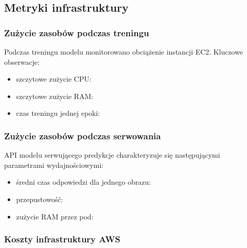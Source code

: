 
\subsection{Metryki infrastruktury}

\subsubsection{Zużycie zasobów podczas treningu}


Podczas treningu modelu monitorowano obciążenie instancji EC2. Kluczowe obserwacje:
\begin{itemize}
  \item szczytowe zużycie CPU: %
  \item szczytowe zużycie RAM: %
  \item czas treningu jednej epoki: %
\end{itemize}

\subsubsection{Zużycie zasobów podczas serwowania}


API modelu serwującego predykcje charakteryzuje się następującymi parametrami wydajnościowymi:
\begin{itemize}
  \item średni czas odpowiedzi dla jednego obrazu: %
  \item przepustowość: %
  \item zużycie RAM przez pod: %
\end{itemize}

\subsubsection{Koszty infrastruktury AWS}

